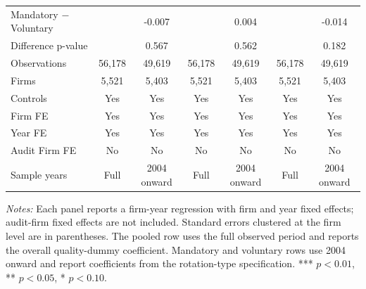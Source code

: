 \begin{table}[htbp]
\begin{threeparttable}
{\begin{tabular}{l cc cc cc}
Mandatory $-$ Voluntary &  & -0.007 &  & 0.004 &  & -0.014 \\
Difference p-value &  & 0.567 &  & 0.562 &  & 0.182 \\
Observations & 56,178 & 49,619 & 56,178 & 49,619 & 56,178 & 49,619 \\
Firms & 5,521 & 5,403 & 5,521 & 5,403 & 5,521 & 5,403 \\
\midrule
Controls & Yes & Yes & Yes & Yes & Yes & Yes \\
Firm FE & Yes & Yes & Yes & Yes & Yes & Yes \\
Year FE & Yes & Yes & Yes & Yes & Yes & Yes \\
Audit Firm FE & No & No & No & No & No & No \\
Sample years & Full & 2004 onward & Full & 2004 onward & Full & 2004 onward \\
\bottomrule
\end{tabular}}
\begin{tablenotes}\footnotesize
\item \textit{Notes:} Each panel reports a firm-year regression with firm and year fixed effects; audit-firm fixed effects are not included. Standard errors clustered at the firm level are in parentheses. The pooled row uses the full observed period and reports the overall quality-dummy coefficient. Mandatory and voluntary rows use 2004 onward and report coefficients from the rotation-type specification. *** \(p<0.01\), ** \(p<0.05\), * \(p<0.10\).
\end{tablenotes}
\end{threeparttable}
\end{table}
